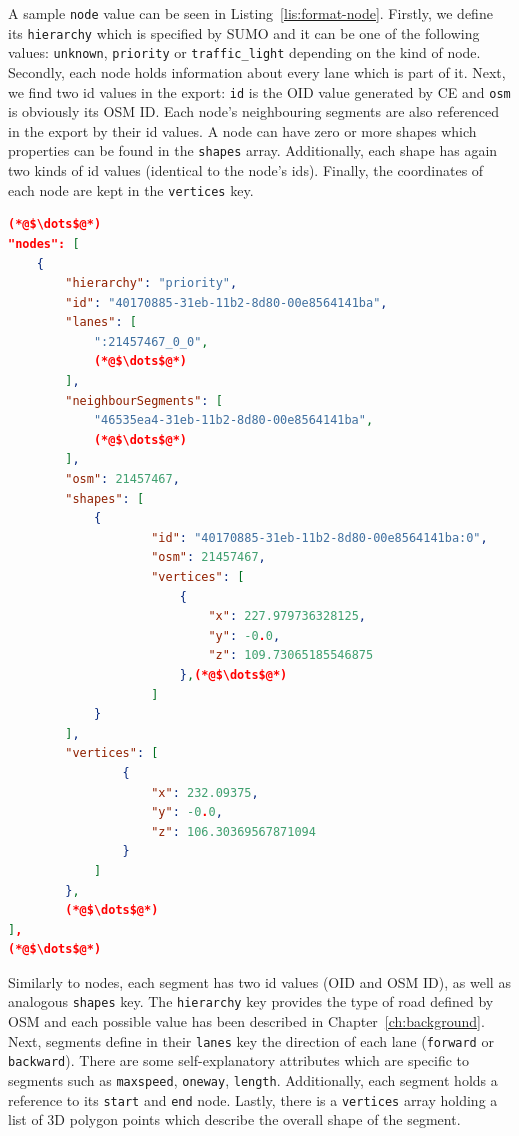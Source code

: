 A sample \texttt{node} value can be seen in Listing~\ref{lis:format-node}. Firstly, we define its \texttt{hierarchy} which is specified by SUMO and it can be one of the following values: \texttt{unknown}, \texttt{priority} or \texttt{traffic\_light} depending on the kind of node. Secondly, each node holds information about every lane which is part of it. Next, we find two id values in the export: \texttt{id} is the OID value generated by CE and \texttt{osm} is obviously its OSM ID. Each node's neighbouring segments are also referenced in the export by their id values. A node can have zero or more shapes which properties can be found in the \texttt{shapes} array. Additionally, each shape has again two kinds of id values (identical to the node's ids). Finally, the coordinates of each node are kept in the \texttt{vertices} key.\\
 	
    \begin{scriptsize}
        \begin{lstlisting}[language=json,firstnumber=1,caption={General overview of the node key in the JSON exportformat.},label={lis:format-node}]
(*@$\dots$@*)
"nodes": [
    {
        "hierarchy": "priority",
        "id": "40170885-31eb-11b2-8d80-00e8564141ba",
        "lanes": [
            ":21457467_0_0",
            (*@$\dots$@*)
        ],
        "neighbourSegments": [
            "46535ea4-31eb-11b2-8d80-00e8564141ba",
            (*@$\dots$@*)
        ],
        "osm": 21457467,
        "shapes": [
            {
                    "id": "40170885-31eb-11b2-8d80-00e8564141ba:0",
                    "osm": 21457467,
                    "vertices": [
                        {
                            "x": 227.979736328125,
                            "y": -0.0,
                            "z": 109.73065185546875
                        },(*@$\dots$@*)
                    ]
            }
        ],
        "vertices": [
                {
                    "x": 232.09375,
                    "y": -0.0,
                    "z": 106.30369567871094
                }
            ]
        },
        (*@$\dots$@*)
],
(*@$\dots$@*)
	   \end{lstlisting}
    \end{scriptsize}
    
Similarly to nodes, each segment has two id values (OID and OSM ID), as well as analogous \texttt{shapes} key. The \texttt{hierarchy} key provides the type of road defined by OSM and each possible value has been described in Chapter~\ref{ch:background}. Next, segments define in their \texttt{lanes} key the direction of each lane (\texttt{forward} or \texttt{backward}). There are some self-explanatory attributes which are specific to segments such as \texttt{maxspeed}, \texttt{oneway}, \texttt{length}. Additionally, each segment holds a reference to its \texttt{start} and \texttt{end} node. Lastly, there is a \texttt{vertices} array holding a list of 3D polygon points which describe the overall shape of the segment.\\

